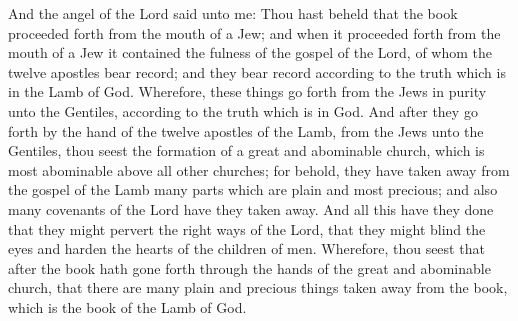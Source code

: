 \bverse \iffalse And the angel of the Lord said unto me: Thou hast beheld that the book proceeded forth from the mouth of a Jew; and when it proceeded forth from the mouth of a Jew it contained the fulness of the gospel of the Lord, of whom the twelve apostles bear record; and they bear record according to the truth which is in the Lamb of God. \fi
And the angel of the Lord said unto me: Thou hast beheld that the book proceeded forth from the mouth of a Jew; and when it proceeded forth from the mouth of a Jew it contained the fulness of the gospel of the Lord, of whom the twelve apostles bear record; and they bear record according to the truth which is in the Lamb of God.
\bverse \iffalse Wherefore, these things go forth from the Jews in purity unto the Gentiles, according to the truth which is in God. \fi
Wherefore, these things go forth from the Jews in purity unto the Gentiles, according to the truth which is in God.
\bverse \iffalse And after they go forth by the hand of the twelve apostles of the Lamb, from the Jews unto the Gentiles, thou seest the formation of a great and abominable church, which is most abominable above all other churches; for behold, they have taken away from the gospel of the Lamb many parts which are plain and most precious; and also many covenants of the Lord have they taken away. \fi
And after they go forth by the hand of the twelve apostles of the Lamb, from the Jews unto the Gentiles, thou seest the formation of a great and abominable church, which is most abominable above all other churches; for behold, they have taken away from the gospel of the Lamb many parts which are plain and most precious; and also many covenants of the Lord have they taken away.
\bverse \iffalse And all this have they done that they might pervert the right ways of the Lord, that they might blind the eyes and harden the hearts of the children of men. \fi
And all this have they done that they might pervert the right ways of the Lord, that they might blind the eyes and harden the hearts of the children of men.
\bverse \iffalse Wherefore, thou seest that after the book hath gone forth through the hands of the great and abominable church, that there are many plain and precious things taken away from the book, which is the book of the Lamb of God. \fi
Wherefore, thou seest that after the book hath gone forth through the hands of the great and abominable church, that there are many plain and precious things taken away from the book, which is the book of the Lamb of God.
